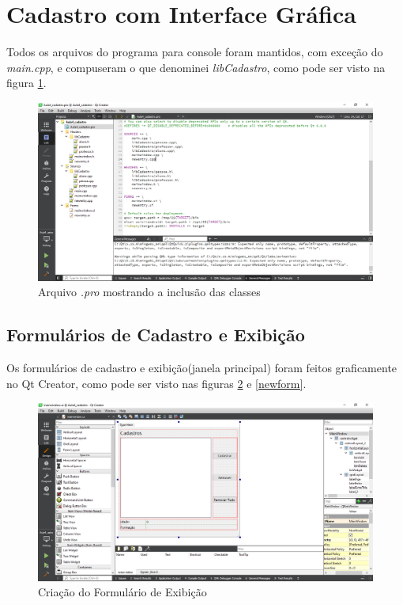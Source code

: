 \documentclass[12pt,a4paper]{article}
\begin{document}
\section{Cadastro com Interface Gráfica}
Todos os arquivos do programa para console foram mantidos, com exceção do \emph{main.cpp}, e compuseram o que denominei \emph{libCadastro}, como pode ser visto na figura \ref{libcadastro}.
\begin{figure}[H]
\centering
\includegraphics[width=\textwidth]{libCadastro}
\caption{Arquivo \emph{.pro} mostrando a inclusão das classes}
\label{libcadastro}
\end{figure}

\subsection*{Formulários de Cadastro e Exibição}

Os formulários de cadastro e exibição(janela principal) foram feitos graficamente no Qt Creator, como pode ser visto nas figuras \ref{mainform} e \ref{newform}.
\begin{figure}[H]
\centering
\includegraphics[width=\textwidth]{mainwin_edit}
\caption{Criação do Formulário de Exibição}
\label{mainform}
\end{figure}
\end{document}

